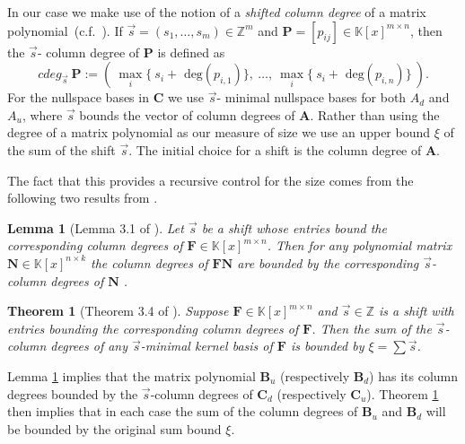 \documentclass[a4paper,11pt]{article}
\newtheorem{thm}{Theorem}
\newtheorem{lem}{Lemma}
\newcommand{\Z}{\mathbb{Z}}
\begin{document}
In our case we make use of the notion of a {\em shifted column degree} of a matrix polynomial~(c.f.~\cite{BecLabVil99}). If
$\vec s = (s_1, \ldots , s_m) \in \Z^m$ and  $\mathbf{P} = [ p_{ij} ] \in \mathbb{K}\left[x\right]^{m \times n}$,  then the $\vec s$- column degree of $\mathbf{P}$  is defined as 
$$
cdeg_{\vec s} ~\mathbf{P} := ( ~\max_i \{~s_i + \mbox{ deg} ( {p}_{i,1}) \} , ~ \ldots ,~ \max_i \{~s_i + \mbox{ deg} ( {p}_{i,n})  \} ~).
$$
For the nullspace bases in $\mathbf{C}$ we use $\vec s$- minimal nullspace bases for both $A_d$ and $A_u$, where $\vec s$ bounds the vector of column degrees of $\mathbf{A}$. Rather than using the degree of a matrix polynomial as our measure of size we use an upper bound $\xi$ of the sum of the shift $\vec s$. The initial choice for a shift is the column degree of $\mathbf{A}$.

The fact that this provides a recursive control for the size comes from the following two results from \cite[page 368]{zhou-labahn-storjohann:12}.

\begin{lem}[Lemma 3.1 of \cite{zhou-labahn-storjohann:12}]\label{thm:1}
Let $\vec{s}$ be a shift whose entries bound the corresponding column degrees of $\mathbf{F}\in\mathbb{K}\left[x\right]^{m\times n}$. Then for any polynomial matrix $\mathbf{N}\in\mathbb{K}\left[x\right]^{n\times k}$ the column degrees of
$\mathbf{F} \mathbf{N}$ are bounded by the corresponding $\vec s$-column degrees of $\mathbf{N}$ .
\end{lem}

\begin{thm}[Theorem 3.4 of \cite{zhou-labahn-storjohann:12}]\label{thm:2}
\label{thm:boundOfSumOfShiftedDegreesOfKernelBasis}
Suppose $\mathbf{F}\in\mathbb{K}\left[x\right]^{m\times n}$ and $\vec{s}\in\mathbb{Z}$ 
is a shift with entries bounding the corresponding column degrees of $\mathbf{F}$. Then the sum of
the $\vec{s}$-column degrees of any $\vec{s}$-minimal kernel basis of $\mathbf{F}$ is bounded by $\xi=\sum\vec{s}$.
\end{thm}

Lemma \ref{thm:1} implies that the matrix polynomial $\mathbf{B}_u$ (respectively $\mathbf{B}_d$) has its column degrees bounded by the $\vec{s}$-column degrees of $\mathbf{C}_d$ (respectively $\mathbf{C}_u$). Theorem \ref{thm:2} then implies that in each case the sum of the column degrees of
$\mathbf{B}_u$ and $\mathbf{B}_d$ will be bounded by the original sum bound $\xi$.
\end{document}
